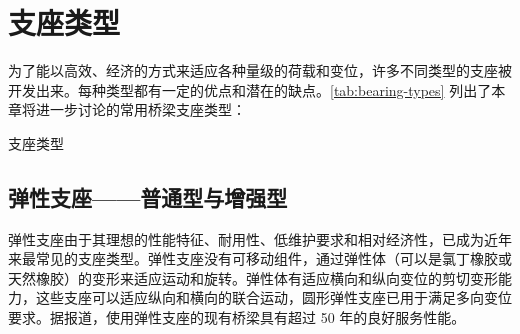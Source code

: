\section{支座类型}
为了能以高效、经济的方式来适应各种量级的荷载和变位，许多不同类型的支座被开发出来。每种类型都有一定的优点和潜在的缺点。\cref{tab:bearing-types} 列出了本章将进一步讨论的常用桥梁支座类型：

\begin{table}
  \caption{支座类型}\label{tab:bearing-types}
  
\end{table}


\subsection{弹性支座——普通型与增强型}
弹性支座由于其理想的性能特征、耐用性、低维护要求和相对经济性，已成为近年来最常见的支座类型。弹性支座没有可移动组件，通过弹性体（可以是氯丁橡胶或天然橡胶）的变形来适应运动和旋转。弹性体有适应横向和纵向变位的剪切变形能力，这些支座可以适应纵向和横向的联合运动，圆形弹性支座已用于满足多向变位要求。据报道，使用弹性支座的现有桥梁具有超过 50 年的良好服务性能。

